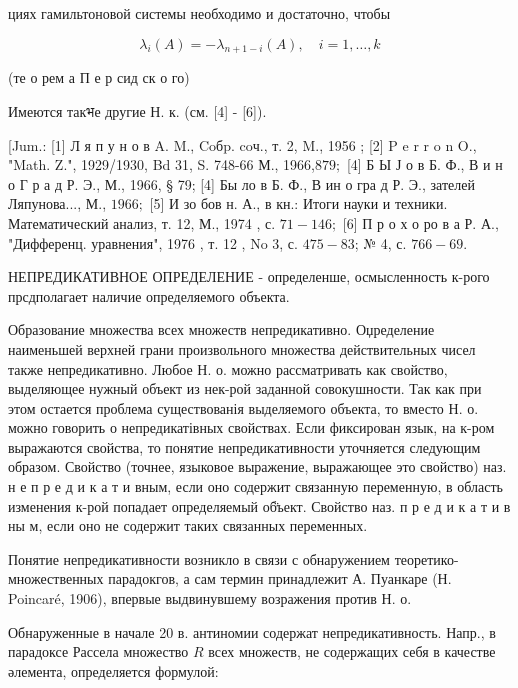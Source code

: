 \documentclass[10pt]{article}
\begin{document}
циях гамильтоновой системы необходимо и достаточно, чтобы



\[

\lambda_{i}(A)=-\lambda_{n+1-i}(A), \quad i=1, \ldots, k

\]



(те о рем а П е р сид ск о го)



Имеются такभе другие Н. к. (см. [4] - [6]).



[Jum.: [1] Л я п у н о в A. M., Coбp. coч., т. 2, M., 1956 ; [2] P e r r o n O., "Math. Z.", 1929/1930, Bd 31, S. 748-66 М., 1966,$879 ;$ [4] Б Ы Ј о в Б. Ф., В и н о Г р а д Р. Э., М., 1966, § 79; [4] Бы ло в Б. Ф., В ин о гра д Р. Э., зателей Ляпунова..., М., $1966 ;$ [5] И зо бов н. А., в кн.: Итоги науки и техники. Математический анализ, т. 12, М., 1974 , с. $71-146 ;$ [6] П р о х о ро в а Р. А., "Дифференц. уравнения", 1976 , т. 12 , No 3, с. $475-83$; № 4, с. $766-69$.



НЕПРЕДИКАТИВНОЕ ОПРЕДЕЛЕНИЕ - определенше, осмысленность к-рого прсдполагает наличие определяемого объекта.



Образование множества всех множеств непредикативно. Оџределение наименьшей верхней грани произвольного множества действительных чисел также непредикативно. Любое Н. о. можно рассматривать как свойство, выделяющее нужный объект из нек-рой заданной совокушности. Так как при этом остается проблема существованія выделяемого объекта, то вместо Н. о. можно говорить о непредикатівных свойствах. Если фиксирован язык, на к-ром выражаются свойства, то понятие непредикативности уточняется следующим образом. Свойство (точнее, языковое выражение, выражающее это свойство) наз. н е п р е д и к а т и вным, если оно содержит связанную переменную, в область изменения к-рой попадает определяемый об̈ъект. Свойство наз. п р е д и к а т и в ны м, если оно не содержит таких связанных переменных.



Понятие непредикативности возникло в связи с обнаружением теоретико-множественных парадокгов, а сам термин принадлежит А. Пуанкаре (Н. Poincaré, 1906), впервые выдвинувшему возражения против Н. о.



Обнаруженные в начале 20 в. антиномии содержат непредикативность. Напр., в парадоксе Рассела множество $R$ всех множеств, не содержащих себя в качестве әлемента, определяется формулой:
\end{document}
